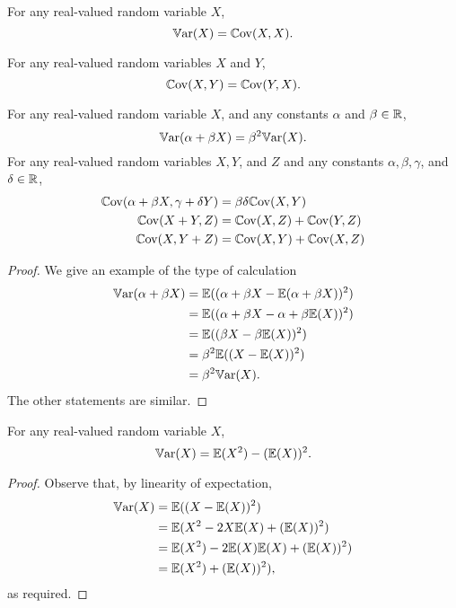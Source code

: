 \documentclass[10pt, a4paper]{article}
\begin{document}
\begin{property}
    For any real-valued random variable $X$,
    \[
    \mathbb{V}\mathrm{ar}(X) = \mathbb{C}\mathrm{ov}(X, X).
    \]
\end{property}
\begin{property}
    For any real-valued random variables $X$ and $Y$,
    \[
    \mathbb{C}\mathrm{ov}(X, Y) = \mathbb{C}\mathrm{ov}(Y, X).
    \]
\end{property}

\begin{corollary}
    For any real-valued random variable $X$,
    and any constants $\alpha$ and $\beta \in \mathbb{R}$,
    \[
    \mathbb{V}\mathrm{ar}(\alpha + \beta X) = \beta ^ 2 \mathbb{V}\mathrm{ar}(X).
    \]
    For any real-valued random variables $X, Y$, and $Z$ and any constants $\alpha, \beta, \gamma$, and $\delta \in \mathbb{R}$,
    \begin{subequations}
        \begin{align}
            \mathbb{C}\mathrm{ov}(\alpha + \beta X, \gamma + \delta Y) &= \beta\delta\mathbb{C}\mathrm{ov}(X, Y) \\
            \mathbb{C}\mathrm{ov}(X + Y, Z) &= \mathbb{C}\mathrm{ov}(X, Z) + \mathbb{C}\mathrm{ov}(Y, Z) \\
            \mathbb{C}\mathrm{ov}(X, Y + Z) &= \mathbb{C}\mathrm{ov}(X, Y) + \mathbb{C}\mathrm{ov}(X, Z)
        \end{align}
    \end{subequations}
    \begin{proof}
        We give an example of the type of calculation
        \begin{align*}
            \mathbb{V}\mathrm{ar}(\alpha + \beta X) &= \mathbb{E}((\alpha + \beta X - \mathbb{E}(\alpha + \beta X)) ^ 2) \\
            &= \mathbb{E}((\alpha + \beta X - \alpha + \beta\mathbb{E}(X)) ^ 2) \\
            &= \mathbb{E}((\beta X - \beta\mathbb{E}(X)) ^ 2) \\
            &= \beta ^ 2\mathbb{E}((X - \mathbb{E}(X)) ^ 2) \\
            &= \beta ^ 2\mathbb{V}\mathrm{ar}(X).
        \end{align*}
        The other statements are similar.
    \end{proof}
\end{corollary}

\begin{corollary}
    For any real-valued random variable $X$,
    \[
    \mathbb{V}\mathrm{ar}(X) = \mathbb{E}(X ^ 2) - (\mathbb{E}(X)) ^ 2.
    \]
    \begin{proof}
        Observe that,
        by linearity of expectation,
        \begin{align*}
            \mathbb{V}\mathrm{ar}(X) &= \mathbb{E}((X - \mathbb{E}(X)) ^ 2) \\
            &= \mathbb{E}(X ^ 2 - 2X\mathbb{E}(X) + (\mathbb{E}(X)) ^ 2) \\
            &= \mathbb{E}(X ^ 2) - 2\mathbb{E}(X)\mathbb{E}(X) + (\mathbb{E}(X)) ^ 2) \\
            &= \mathbb{E}(X ^ 2) + (\mathbb{E}(X)) ^ 2),
        \end{align*}
        as required.
    \end{proof}
\end{corollary}
\end{document}
